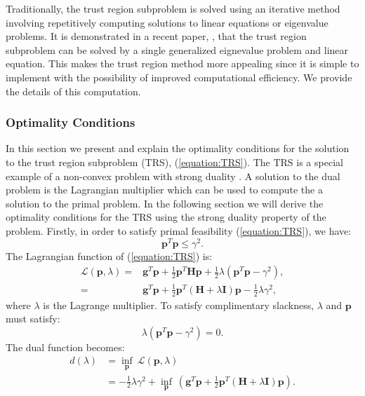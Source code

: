\documentclass[letterpaper,12pt,titlepage,oneside,final]{book}
\begin{document}
	Traditionally, the trust region subproblem is solved using an iterative method involving repetitively computing solutions to linear equations or eigenvalue problems. It is demonstrated in a recent paper, \cite{adachi.paper}, that the trust region subproblem can be solved by a single generalized eignevalue problem and linear equation. This makes the trust region method more appealing since it is simple to implement with the possibility of improved computational efficiency. We provide the details of this computation.  
	
	\subsubsection{Optimality Conditions}
	
	In this section we present and explain the optimality conditions for the solution to the trust region subproblem (TRS), (\ref{equation:TRS}). The TRS is a special example of a non-convex problem with strong duality \cite{boyd}. A solution to the dual problem is the Lagrangian multiplier which can be used to compute the a solution to the primal problem. In the following section we will derive the optimality conditions for the TRS using the strong duality property of the problem. Firstly, in order to satisfy primal feasibility (\ref{equation:TRS}), we have:
	\begin{equation}
	\mathbf{p}^{T}\mathbf{p} \leq \gamma^2.
	\label{equation:inbounds}
	\end{equation}
	The Lagrangian function of (\ref{equation:TRS}) is:
	\begin{equation}
	\begin{split}
	\mathcal{L}(\mathbf{p},\lambda) = &\mathbf{g}^{T}\mathbf{p} + \frac{1}{2}\mathbf{p}^{T}\mathbf{Hp} + \frac{1}{2}\lambda (\mathbf{p}^{T}\mathbf{p} - \gamma^{2}),\\ = &\mathbf{g}^{T}\mathbf{p} + \frac{1}{2}\mathbf{p}^{T}(\mathbf{H} + \lambda\mathbf{I})\mathbf{p} - \frac{1}{2}\lambda\gamma^{2},
	\label{equation:lagrangian}
	\end{split}
	\end{equation}
	where $\lambda$ is the Lagrange multiplier. To satisfy complimentary slackness, $\lambda$ and $\mathbf{p}$ must satisfy:
	\begin{equation}
	\lambda(\mathbf{p}^{T}\mathbf{p} - \gamma^{2}) = 0.
	\label{equation:complementary_slackness}
	\end{equation}
	The dual function becomes:
	\begin{equation}
	\begin{aligned}
	d(\lambda) & = \underset{\mathbf{p}}{\inf}
	\ \mathcal{L}(\mathbf{p},\lambda)  \\
	& = -\frac{1}{2}\lambda\gamma^{2} + \underset{\mathbf{p}}{\inf}
	\ (\mathbf{g}^{T}\mathbf{p} + \frac{1}{2}\mathbf{p}^{T}(\mathbf{H} + \lambda\mathbf{I})\mathbf{p}). \\
	\label{equation:dual}
	\end{aligned}
	\end{equation}
\end{document}
